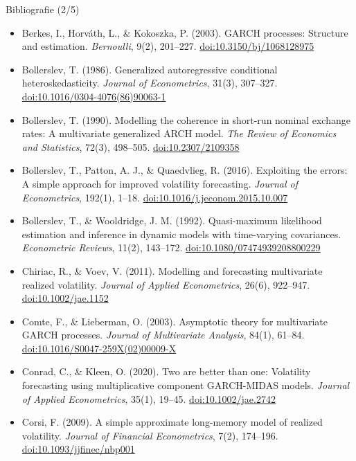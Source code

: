 \begin{frame}{Bibliografie (2/5)}
\itemsize{\tiny}
\begin{itemize}
    \item Berkes, I., Horváth, L., \& Kokoszka, P. (2003). GARCH processes: Structure and estimation. \textit{Bernoulli}, 9(2), 201--227. \href{https://doi.org/10.3150/bj/1068128975}{doi:10.3150/bj/1068128975}
    \item Bollerslev, T. (1986). Generalized autoregressive conditional heteroskedasticity. \textit{Journal of Econometrics}, 31(3), 307--327. \href{https://doi.org/10.1016/0304-4076(86)90063-1}{doi:10.1016/0304-4076(86)90063-1}
    \item Bollerslev, T. (1990). Modelling the coherence in short-run nominal exchange rates: A multivariate generalized ARCH model. \textit{The Review of Economics and Statistics}, 72(3), 498--505. \href{https://doi.org/10.2307/2109358}{doi:10.2307/2109358}
    \item Bollerslev, T., Patton, A. J., \& Quaedvlieg, R. (2016). Exploiting the errors: A simple approach for improved volatility forecasting. \textit{Journal of Econometrics}, 192(1), 1--18. \href{https://doi.org/10.1016/j.jeconom.2015.10.007}{doi:10.1016/j.jeconom.2015.10.007}
    \item Bollerslev, T., \& Wooldridge, J. M. (1992). Quasi-maximum likelihood estimation and inference in dynamic models with time-varying covariances. \textit{Econometric Reviews}, 11(2), 143--172. \href{https://doi.org/10.1080/07474939208800229}{doi:10.1080/07474939208800229}
    \item Chiriac, R., \& Voev, V. (2011). Modelling and forecasting multivariate realized volatility. \textit{Journal of Applied Econometrics}, 26(6), 922--947. \href{https://doi.org/10.1002/jae.1152}{doi:10.1002/jae.1152}
    \item Comte, F., \& Lieberman, O. (2003). Asymptotic theory for multivariate GARCH processes. \textit{Journal of Multivariate Analysis}, 84(1), 61--84. \href{https://doi.org/10.1016/S0047-259X(02)00009-X}{doi:10.1016/S0047-259X(02)00009-X}
    \item Conrad, C., \& Kleen, O. (2020). Two are better than one: Volatility forecasting using multiplicative component GARCH-MIDAS models. \textit{Journal of Applied Econometrics}, 35(1), 19--45. \href{https://doi.org/10.1002/jae.2742}{doi:10.1002/jae.2742}
    \item Corsi, F. (2009). A simple approximate long-memory model of realized volatility. \textit{Journal of Financial Econometrics}, 7(2), 174--196. \href{https://doi.org/10.1093/jjfinec/nbp001}{doi:10.1093/jjfinec/nbp001}

\end{itemize}
\end{frame}
